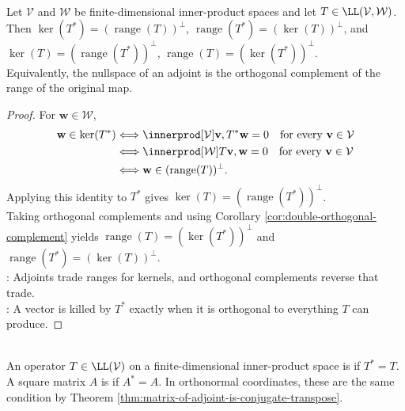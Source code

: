\begin{proposition} \label{prop:adjoint-kernel-range-orthogonality} \\
Let $\mathcal{V}$ and $\mathcal{W}$ be finite-dimensional inner-product spaces and let $T\in\LL(\mathcal{V},\mathcal{W})$.\\
Then $\ker(T^*)=(\operatorname{range}(T))^{\perp}$, $\operatorname{range}(T^*)=(\ker(T))^{\perp}$, and $\ker(T)=(\operatorname{range}(T^*))^{\perp}$, $\operatorname{range}(T)=(\ker(T^*))^{\perp}$.\\
Equivalently, the nullspace of an adjoint is the orthogonal complement of the range of the original map.
\begin{proof}
For $\mathbf{w}\in\mathcal{W}$,
\begin{align}
\mathbf{w}\in\ker(T^*)
&\Longleftrightarrow \innerprod[\mathcal{V}]{\mathbf{v},T^*\mathbf{w}}=0\quad\text{for every }\mathbf{v}\in\mathcal{V} \nonumber\\
&\Longleftrightarrow \innerprod[\mathcal{W}]{T\mathbf{v},\mathbf{w}}=0\quad\text{for every }\mathbf{v}\in\mathcal{V} \nonumber\\
&\Longleftrightarrow \mathbf{w}\in(\operatorname{range}(T))^{\perp}.
\nonumber
\end{align}
Applying this identity to $T^*$ gives $\ker(T)=(\operatorname{range}(T^*))^{\perp}$.\\
Taking orthogonal complements and using Corollary \ref{cor:double-orthogonal-complement} yields $\operatorname{range}(T)=(\ker(T^*))^{\perp}$ and $\operatorname{range}(T^*)=(\ker(T))^{\perp}$.\\
: Adjoints trade ranges for kernels, and orthogonal complements reverse that trade.\\
: A vector is killed by $T^*$ exactly when it is orthogonal to everything $T$ can produce.
\end{proof}
\end{proposition}

\begin{definition} \label{def:self-adjoint-hermitian} \\
An operator $T\in\LL(\mathcal{V})$ on a finite-dimensional inner-product space is  if $T^*=T$. A square matrix $A$ is  if $A^*=A$. In orthonormal coordinates, these are the same condition by Theorem \ref{thm:matrix-of-adjoint-is-conjugate-transpose}.
\end{definition}

